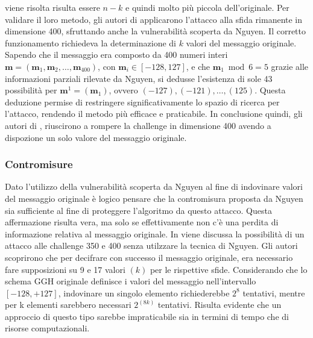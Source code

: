 viene risolta risulta essere $n-k$ e quindi molto più piccola dell'originale.  
Per validare il loro metodo, gli autori di \cite{Nguyen400} applicarono l'attacco alla
sfida rimanente in dimensione 400, sfruttando anche la vulnerabilità scoperta da Nguyen. 
Il corretto funzionamento richiedeva la determinazione di $k$ valori del messaggio originale. 
Sapendo che il messaggio era composto da 400 numeri interi 
$\mathbf{m} = (\mathbf{m}_1, \mathbf{m}_2,\dots, \mathbf{m}_{400})$, 
con $\mathbf{m}_i \in [-128, 127]$, e che $\mathbf{m}_1 \bmod 6 = 5$ 
grazie alle informazioni parziali rilevate da Nguyen, si dedusse l'esistenza di sole 43 possibilità 
per $\mathbf{m}^1 = (\mathbf{m}_1)$, ovvero $(-127), (-121), \dots, (125)$. 
Questa deduzione permise di restringere significativamente lo spazio di ricerca per 
l'attacco, rendendo il metodo più efficace e praticabile.
In conclusione quindi, gli autori di \cite{Nguyen400}, riuscirono a rompere la challenge
in dimensione 400 avendo a dispozione un solo valore del messaggio originale.

\subsubsection{Contromisure}
Dato l'utilizzo della vulnerabilità scoperta da Nguyen al fine di indovinare valori del
messaggio originale è logico pensare che la contromisura proposta da Nguyen sia sufficiente
al fine di proteggere l'algoritmo da questo attacco. Questa affermazione risulta vera, ma solo
se effettivamente non c'è una perdita di informazione relativa al messaggio originale. 
In \cite{Nguyen400} viene discussa la possibilità di un attacco alle challenge 350 e 400
senza utilzzare la tecnica di Nguyen. 
Gli autori scoprirono che per decifrare con successo il messaggio originale, era necessario 
fare supposizioni su 9 e 17 valori $(k)$ per le rispettive sfide. Considerando che lo schema 
GGH originale definisce i valori del messaggio nell'intervallo $[-128, +127]$, indovinare un 
singolo elemento richiederebbe $2^8$ tentativi, mentre per k elementi sarebbero necessari 
$2^{(8k)}$ tentativi. Risulta evidente che un approccio di questo tipo sarebbe impraticabile 
sia in termini di tempo che di risorse computazionali.
